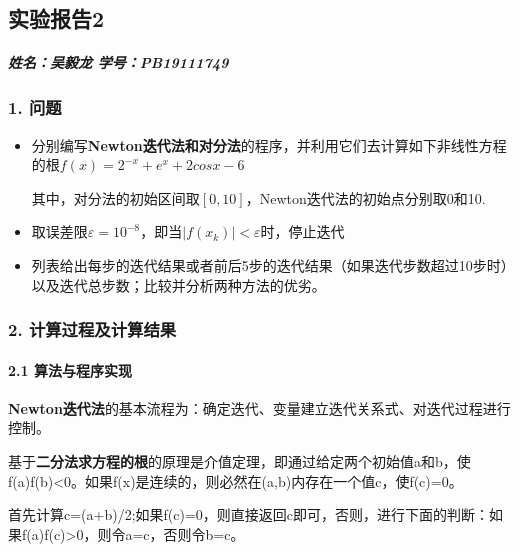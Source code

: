 \documentclass[
]{article}
\author{}
\date{}
\begin{document}
\hypertarget{ux5b9eux9a8cux62a5ux544a2}{%
\subsection{实验报告2}\label{ux5b9eux9a8cux62a5ux544a2}}

\hypertarget{ux59d3ux540dux5434ux6bc5ux9f99----ux5b66ux53f7pb19111749}{%
\subparagraph{姓名：吴毅龙
学号：PB19111749}\label{ux59d3ux540dux5434ux6bc5ux9f99----ux5b66ux53f7pb19111749}}

\hypertarget{1-ux95eeux9898}{%
\subsubsection{1. 问题}\label{1-ux95eeux9898}}

\begin{itemize}
\item
  分别编写\textbf{Newton迭代法和对分法}的程序，并利用它们去计算如下非线性方程的根\(f(x)=2^{-x}+e^x+2cosx-6\)

  其中，对分法的初始区间取\([0,10]\)，Newton迭代法的初始点分别取0和10.
\item
  取误差限\(ε={10}^{-8}\)，即当\(|f(x_k)|<ε\)时，停止迭代
\item
  列表给出每步的迭代结果或者前后5步的迭代结果（如果迭代步数超过10步时）以及迭代总步数；比较并分析两种方法的优劣。
\end{itemize}

\hypertarget{2-ux8ba1ux7b97ux8fc7ux7a0bux53caux8ba1ux7b97ux7ed3ux679c}{%
\subsubsection{2.
计算过程及计算结果}\label{2-ux8ba1ux7b97ux8fc7ux7a0bux53caux8ba1ux7b97ux7ed3ux679c}}

\hypertarget{21-ux7b97ux6cd5ux4e0eux7a0bux5e8fux5b9eux73b0}{%
\paragraph{2.1
算法与程序实现}\label{21-ux7b97ux6cd5ux4e0eux7a0bux5e8fux5b9eux73b0}}

\textbf{Newton迭代法}的基本流程为：确定迭代、变量建立迭代关系式、对迭代过程进行控制。

基于\textbf{二分法求方程的根}的原理是介值定理，即通过给定两个初始值a和b，使f(a)f(b)\textless0。如果f(x)是连续的，则必然在(a,b)内存在一个值c，使f(c)=0。

首先计算c=(a+b)/2;如果f(c)=0，则直接返回c即可，否则，进行下面的判断：如果f(a)f(c)\textgreater0，则令a=c，否则令b=c。
\end{document}
